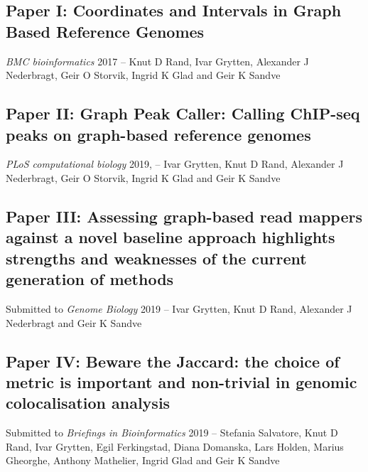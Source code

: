 \subsection*{Paper I: Coordinates and Intervals in Graph Based Reference Genomes}
\emph{BMC bioinformatics} 2017 --
Knut D Rand, Ivar Grytten, Alexander J Nederbragt, Geir O Storvik, Ingrid K Glad and Geir K Sandve


% 

\subsection*{Paper II: Graph Peak Caller: Calling ChIP-seq peaks on graph-based reference genomes}
\emph{PLoS computational biology} 2019, --
Ivar Grytten, Knut D Rand, Alexander J Nederbragt, Geir O Storvik, Ingrid K Glad and Geir K Sandve


\subsection*{Paper III: Assessing graph-based read mappers against a novel baseline approach highlights strengths and weaknesses of the current generation of methods}
Submitted to \emph{Genome Biology} 2019 -- Ivar Grytten, Knut D Rand, Alexander J Nederbragt and Geir K Sandve
\subsection*{Paper IV: Beware the Jaccard: the choice of metric is important and non-trivial in genomic colocalisation analysis}
Submitted to \emph{Briefings in Bioinformatics} 2019 -- Stefania Salvatore, Knut D Rand, Ivar Grytten, Egil Ferkingstad, Diana Domanska, Lars Holden, Marius Gheorghe, Anthony Mathelier, Ingrid Glad and Geir K Sandve

